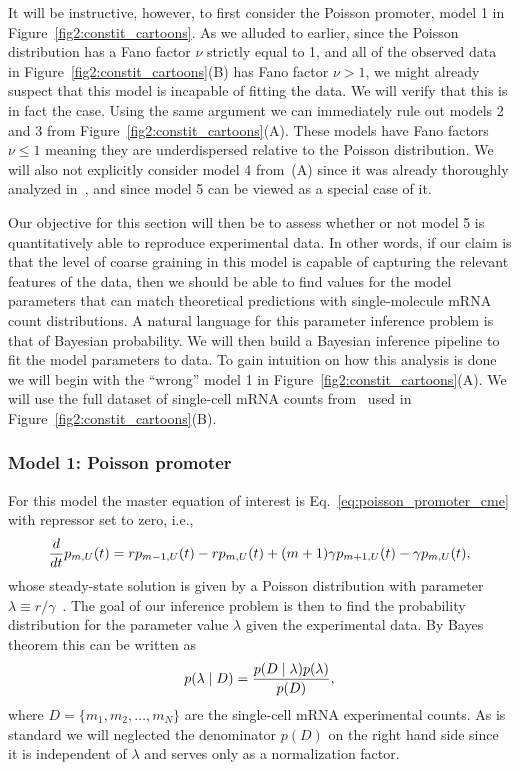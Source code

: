 It will be instructive, however, to first consider the Poisson promoter, model 1
in Figure~\ref{fig2:constit_cartoons}. As we alluded to earlier, since the
Poisson distribution has a Fano factor $\nu$ strictly equal to 1, and all of
the observed data in Figure~\ref{fig2:constit_cartoons}(B) has Fano factor
$\nu>1$, we might already suspect that this model is incapable of fitting the
data. We will verify that this is in fact the case. Using the same argument we
can immediately rule out models 2 and 3 from
Figure~\ref{fig2:constit_cartoons}(A). These models have Fano factors $\nu\le 1$
meaning they are underdispersed relative to the Poisson distribution. We will
also not explicitly consider model 4 from~(A) since
it was already thoroughly analyzed in~\cite{Razo-Mejia2020}, and since model 5
can be viewed as a special case of it.

Our objective for this section will then be to assess whether or not model 5 is
quantitatively able to reproduce experimental data. In other words, if our claim
is that the level of coarse graining in this model is capable of capturing the
relevant features of the data, then we should be able to find values for the
model parameters that can match theoretical predictions with single-molecule
mRNA count distributions. A natural language for this parameter inference
problem is that of Bayesian probability. We will then build a Bayesian inference
pipeline to fit the model parameters to data. To gain intuition on how this
analysis is done we will begin with the ``wrong'' model 1 in
Figure~\ref{fig2:constit_cartoons}(A). We will use the full dataset of
single-cell mRNA counts from~\cite{Jones2014} used in
Figure~\ref{fig2:constit_cartoons}(B).

\subsubsection{Model 1: Poisson promoter}

For this model the master equation of interest is
Eq.~\ref{eq:poisson_promoter_cme} with repressor set to zero, i.e.,
\begin{equation}
{d\over dt}p_{m,U}(t) = 
        rp_{m-1,U}(t) 
        - rp_{m,U}(t)
        + (m+1)\gamma p_{m+1,U}(t) 
        - \gamma p_{m,U}(t),
\end{equation}
whose steady-state solution is given by a Poisson distribution with parameter
$\lambda \equiv r / \gamma$~\cite{Sanchez2013}. The goal of our inference 
problem is then to find the probability distribution for the parameter value
$\lambda$ given the experimental data. By Bayes theorem this can be written as
\begin{equation}
p(\lambda \mid D) = {p(D \mid \lambda) p(\lambda) \over p(D)},
\end{equation}
where $D = \{m_1, m_2, \ldots, m_N \}$ are the single-cell mRNA experimental
counts. As is standard we will neglected the denominator $p(D)$ on the right
hand side since it is independent of $\lambda$ and serves only as a
normalization factor.

